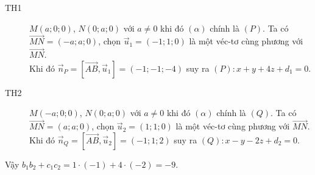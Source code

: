 \begin{ex}
{\begin{description}
\item[TH1] $M \left(a;0;0\right)$, $N \left(0;a;0\right)$ với $a \neq 0$ khi đó $\left(\alpha\right)$ chính là $\left(P\right)$. Ta có $\overrightarrow{MN} = \left(-a;a;0\right)$, chọn $\overrightarrow{u}_1 = \left(-1;1;0\right)$ là một véc-tơ cùng phương với $\overrightarrow{MN}$.\\
Khi đó $\overrightarrow{n}_P = \left[\overrightarrow{AB},\overrightarrow{u}_1\right] = \left(-1;-1;-4\right)$
suy ra $\left(P\right) \colon x+y+4z+d_1 = 0$.
\item[TH2] $M \left(-a;0;0\right)$, $N \left(0;a;0\right)$ với $a \neq 0$ khi đó $\left(\alpha\right)$ chính là $\left(Q\right)$. Ta có $\overrightarrow{MN} = \left(a;a;0\right)$, chọn $\overrightarrow{u}_2 = \left(1;1;0\right)$ là một véc-tơ cùng phương với $\overrightarrow{MN}$.\\
Khi đó $\overrightarrow{n}_Q = \left[\overrightarrow{AB},\overrightarrow{u}_2\right] = \left(-1;1;2\right)$
suy ra $\left(Q\right) \colon x-y-2z+d_2 = 0$.
\end{description}
Vậy $b_1b_2 + c_1c_2 = 1 \cdot \left(-1\right) + 4 \cdot \left(-2\right) = -9$.
}
\end{ex}
